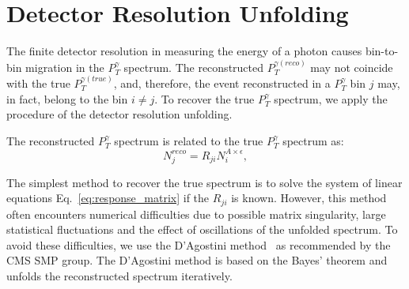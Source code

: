 \section{Detector Resolution Unfolding}
\label{sec:Unfolding}



The finite detector resolution in measuring the energy of a photon causes bin-to-bin migration in the $P_T^{\gamma}$ spectrum. The reconstructed $P_T^{\gamma(reco)}$ may not coincide with the true $P_T^{\gamma(true)}$, and, therefore, the event reconstructed in a $P_T^{\gamma}$ bin $j$ may, in fact, belong to the bin $i \neq j$. To recover the true $P_T^{\gamma}$ spectrum, we apply the procedure of the detector resolution unfolding.

The reconstructed $P_T^{\gamma}$ spectrum is related to the true $P_T^{\gamma}$ spectrum as:
\begin{equation}\label{eq:response_matrix}
  N^{reco}_{j} = R_{ji} N^{A\times\epsilon}_{i},
\end{equation}

The simplest method to recover the true spectrum is to solve the system of linear equations Eq.~\ref{eq:response_matrix} if the $R_{ji}$ is known. However, this method often encounters numerical difficulties due to possible matrix singularity, large statistical fluctuations and the effect of oscillations of the unfolded spectrum. To avoid these difficulties, we use the D'Agostini method~\cite{ref_DAgostini} as recommended by the CMS SMP group. The D'Agostini method is based on the Bayes' theorem and unfolds the reconstructed spectrum iteratively.

